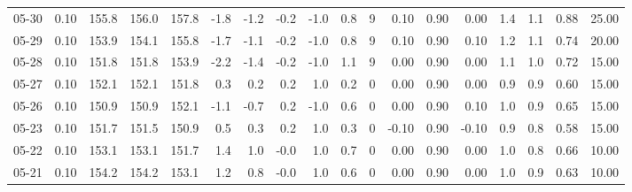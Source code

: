\begin{threeparttable}
{\begin{tabular}{lrrrrrrrrrrrrrrrrr}
  05-30 &     0.10 & 155.8 & 156.0 & 157.8 &       -1.8 &           -1.2 &                      -0.2 &                     -1.0 &                 0.8 &              9 &       0.10 &      0.90 &           0.00 &              1.4 &                 1.1 &            0.88 &                  25.00 \\
  05-29 &     0.10 & 153.9 & 154.1 & 155.8 &       -1.7 &           -1.1 &                      -0.2 &                     -1.0 &                 0.8 &              9 &       0.10 &      0.90 &           0.10 &              1.2 &                 1.1 &            0.74 &                  20.00 \\
  05-28 &     0.10 & 151.8 & 151.8 & 153.9 &       -2.2 &           -1.4 &                      -0.2 &                     -1.0 &                 1.1 &              9 &       0.00 &      0.90 &           0.00 &              1.1 &                 1.0 &            0.72 &                  15.00 \\
  05-27 &     0.10 & 152.1 & 152.1 & 151.8 &        0.3 &            0.2 &                       0.2 &                      1.0 &                 0.2 &              0 &       0.00 &      0.90 &           0.00 &              0.9 &                 0.9 &            0.60 &                  15.00 \\
  05-26 &     0.10 & 150.9 & 150.9 & 152.1 &       -1.1 &           -0.7 &                       0.2 &                     -1.0 &                 0.6 &              0 &       0.00 &      0.90 &           0.10 &              1.0 &                 0.9 &            0.65 &                  15.00 \\
  05-23 &     0.10 & 151.7 & 151.5 & 150.9 &        0.5 &            0.3 &                       0.2 &                      1.0 &                 0.3 &              0 &      -0.10 &      0.90 &          -0.10 &              0.9 &                 0.8 &            0.58 &                  15.00 \\
  05-22 &     0.10 & 153.1 & 153.1 & 151.7 &        1.4 &            1.0 &                      -0.0 &                      1.0 &                 0.7 &              0 &       0.00 &      0.90 &           0.00 &              1.0 &                 0.8 &            0.66 &                  10.00 \\
  05-21 &     0.10 & 154.2 & 154.2 & 153.1 &        1.2 &            0.8 &                      -0.0 &                      1.0 &                 0.6 &              0 &       0.00 &      0.90 &           0.00 &              1.0 &                 0.9 &            0.63 &                  10.00 \\

\end{tabular}}
\end{threeparttable}
